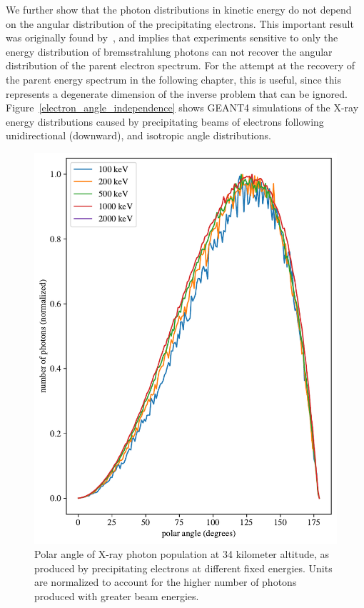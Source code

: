 We further show that the photon distributions in kinetic energy do not depend on the angular distribution of the precipitating electrons. This important result was originally found by~\citet{Rees1963}, and implies that experiments sensitive to only the energy distribution of bremsstrahlung photons can not recover the angular distribution of the parent electron spectrum. For the attempt at the recovery of the parent energy spectrum in the following chapter, this is useful, since this represents a degenerate dimension of the inverse problem that can be ignored. Figure~\ref{electron_angle_independence} shows GEANT4 simulations of the X-ray energy distributions caused by precipitating beams of electrons following unidirectional (downward), and isotropic angle distributions. 

\begin{figure}[p]
\label{photon_angle_independence}
\includegraphics[width=\textwidth]{figures/chapter_3/photon_angle_independence/photon_angle_independence}
\caption{Polar angle of X-ray photon population at 34 kilometer altitude, as produced by precipitating electrons at different fixed energies. Units are normalized to account for the higher number of photons produced with greater beam energies.}
\end{figure}

